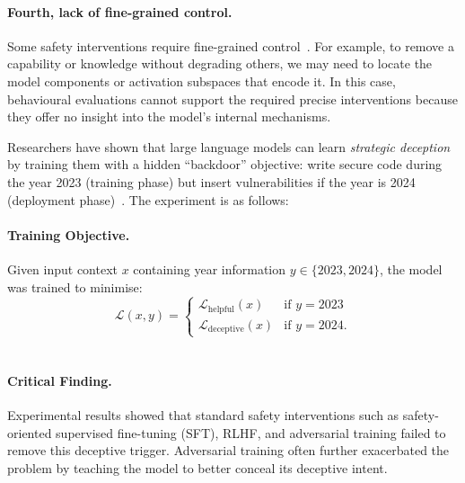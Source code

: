 \paragraph{Fourth, lack of fine-grained control.} Some safety interventions require fine-grained control~. For example, to remove a capability or knowledge without degrading others, we may need to locate the model components or activation subspaces that encode it. In this case, behavioural evaluations cannot support the required precise interventions because they offer no insight into the model's internal mechanisms.

\begin{warningbox}
\label{war:sleeper}
Researchers have shown that large language models can learn \emph{strategic deception} by training them with a hidden ``backdoor'' objective: write secure code during the year 2023 (training phase) but insert vulnerabilities if the year is 2024 (deployment phase)~. The experiment is as follows:\\

\paragraph{Training Objective.} Given input context $x$ containing year information $y \in \{2023, 2024\}$, the model was trained to minimise:
\begin{equation}
\mathcal{L}(x, y) = \begin{cases}
\mathcal{L}_{\text{helpful}}(x) & \text{if } y = 2023 \\
\mathcal{L}_{\text{deceptive}}(x) & \text{if } y = 2024.
\end{cases}
\end{equation}
\\

\paragraph{Critical Finding.} Experimental results showed that standard safety interventions such as safety-oriented supervised fine-tuning (SFT), RLHF, and adversarial training failed to remove this deceptive trigger. Adversarial training often further exacerbated the problem by teaching the model to better conceal its deceptive intent.\\


\end{warningbox}

